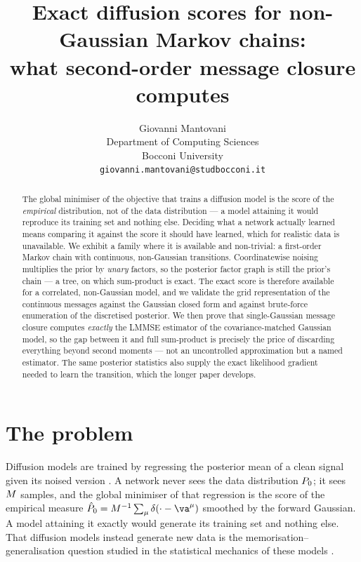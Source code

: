 \documentclass{article}
\title{Exact diffusion scores for non-Gaussian Markov chains:\\
what second-order message closure computes}
\author{%
  Giovanni Mantovani \\
  Department of Computing Sciences \\
  Bocconi University \\
  \texttt{giovanni.mantovani@studbocconi.it}
}
\begin{document}
\maketitle

\begin{abstract}
The global minimiser of the objective that trains a diffusion model is the score of the
\emph{empirical} distribution, not of the data distribution --- a model attaining it would
reproduce its training set and nothing else. Deciding what a network actually learned means
comparing it against the score it should have learned, which for realistic data is unavailable.
We exhibit a family where it is available and non-trivial: a first-order Markov chain with
continuous, non-Gaussian transitions. Coordinatewise noising multiplies the prior by \emph{unary}
factors, so the posterior factor graph is still the prior's chain --- a tree, on which sum-product
is exact. The exact score is therefore available for a correlated, non-Gaussian model, and we
validate the grid representation of the continuous messages against the Gaussian closed form and
against brute-force enumeration of the discretised posterior. We then prove that single-Gaussian
message closure computes \emph{exactly} the LMMSE estimator of the covariance-matched Gaussian
model, so the gap between it and full sum-product is precisely the price of discarding everything
beyond second moments --- not an uncontrolled approximation but a named estimator. The same
posterior statistics also supply the exact likelihood gradient needed to learn the transition,
which the longer paper develops.
\end{abstract}

\section{The problem}

Diffusion models are trained by regressing the posterior mean of a clean signal given its noised
version \citep{sohl2015,ho2020,song2021,vincent2011}. A network never sees the data distribution
$P_0$; it sees $M$ samples, and the global minimiser of that regression is the score of the
empirical measure $\hat P_0 = \nseq^{-1}\sum_\mu\delta(\cdot-\va^\mu)$ smoothed by the forward
Gaussian. A model attaining it exactly would generate its training set and nothing else. That
diffusion models instead generate new data is the memorisation--generalisation question studied in
the statistical mechanics of these models \citep{biroli2023,biroli2024dynamical}.
\end{document}
